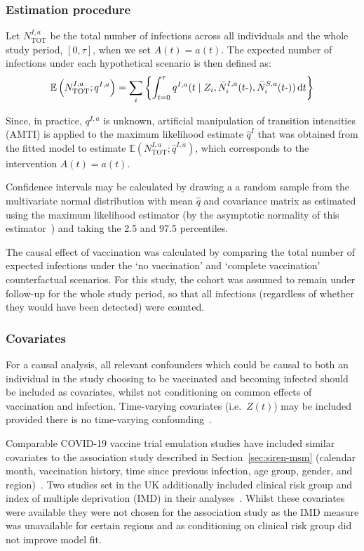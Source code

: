 \subsubsection{Estimation procedure}

Let $N^{I,a}_{\text{TOT}}$ be the total number of infections across all individuals and the whole study period, $[0, \tau]$, when we set $A(t) = a(t)$. The expected number of infections under each hypothetical scenario is then defined as:
%
\[
    \mathbb{E}\left(N^{I,a}_{\text{TOT}}; q^{I, a}\right) = \sum_i \left\{ \int_{t = 0}^\tau q^{I, a}(t \mid Z_i, \bar{N}_i^{I, a} (t \mbox{-}), \bar{N}_i^{S, a} (t \mbox{-})) \mathop{}\!\mathrm{d} t \right\}
\]

Since, in practice, $q^{I,a}$ is unknown, artificial manipulation of transition intensities (AMTI) is applied to the maximum likelihood estimate $\hat{q}^I$ that was obtained from the fitted model to estimate $\mathbb{E}(N^{I,a}_{\text{TOT}}; \hat{q}^{I,a})$, which corresponds to the intervention $A(t) = a(t)$.

Confidence intervals may be calculated by drawing a a random sample from the multivariate normal distribution with mean $\hat{q}$ and covariance matrix as estimated using the maximum likelihood estimator (by the asymptotic normality of this estimator~\parencite{Young2005-vx}) and taking the 2.5 and 97.5 percentiles.

The causal effect of vaccination was calculated by comparing the total number of expected infections under the `no vaccination' and `complete vaccination' counterfactual scenarios. For this study, the cohort was assumed to remain under follow-up for the whole study period, so that all infections (regardless of whether they would have been detected) were counted.

\subsubsection{Covariates}

For a causal analysis, all relevant confounders which could be causal to both an individual in the study choosing to be vaccinated and becoming infected should be included as covariates, whilst not conditioning on common effects of vaccination and infection. Time-varying covariates (i.e.\ $Z(t)$) may be included provided there is no time-varying confounding~\parencite{Ryalen2020-nl}.

Comparable COVID-19 vaccine trial emulation studies have included similar covariates to the association study described in Section~\ref{sec:siren-msm} (calendar month, vaccination history, time since previous infection, age group, gender, and region)~\parencite{Xie2022-np, Hulme2023-fw, Barda2021-dq}. Two studies set in the UK additionally included clinical risk group and index of multiple deprivation (IMD) in their analyses~\parencite{Xie2022-np, Hulme2023-fw}. Whilst these covariates were available they were not chosen for the association study as the IMD measure was unavailable for certain regions and as conditioning on clinical risk group did not improve model fit.

